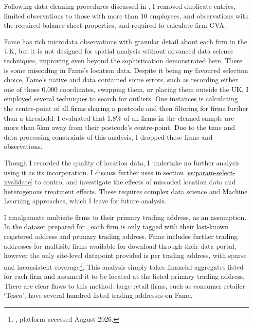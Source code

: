 Following data cleaning procedures discussed in \cite{Irastorza-Fadrique2026},
I removed duplicate entries, limited observations to those with more than 10 employees,
and observations with the required balance sheet properties,
 and  required to calculate firm GVA.
\par
Fame has rich microdata observations with granular detail about each firm in the UK,
but it is not designed for spatial analysis without advanced data science techniques,
improving even beyond the sophistication demonstrated here.
There is some miscoding in Fame's location data.
Despite it being my favoured  selection choice,
Fame's native  and  data contained some errors,
such as recording either one of those $0.000$ coordinates, swapping them,
or placing them outside the UK.
I employed several techniques to search for outliers.
One instances is calculating the centre-point of all firms sharing a postcode
and then filtering for firms further than a threshold:
I evaluated that 1.8\% of all firms in the cleaned sample
are more than 5km away from their postcode's centre-point.
Due to the time and data processing constraints of this analysis,
I dropped these firms and observations.
\par
Though I recorded the quality of location data,
I undertake no further analysis using it as its incorporation.
I discuss further uses in section \ref{ss:param-select-xvalidate}
to control and investigate the effects of miscoded location data
and heterogenous treatment effects.
These requires complex data science and Machine Learning approaches,
which I leave for future analysis.
\par
I amalgamate multisite firms to their primary trading address, as an assumption.
In the dataset prepared for \cite{Irastorza-Fadrique2026},
each firm is only tagged with their last-known registered address and primary trading address.
Fame includes further trading addresses for multisite firms available for download through their data portal,
however the only site-level datapoint provided is  per trading address,
with sparse and inconsistent coverage\footnote{\cite{MoodysAnalytics2026}, platform accessed August 2026.}.
This analysis simply takes financial aggregates listed for each firm
and assumed it to be located at the listed primary trading address.
There are clear flaws to this method: large retail firms, such as consumer retailer `Tesco',
have several hundred listed trading addresses on Fame,
